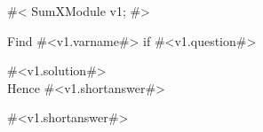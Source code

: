 

#<
SumXModule v1;
#>

Find #<v1.varname#> if #<v1.question#>

#<v1.solution#> \\[1.8mm]
Hence #<v1.shortanswer#>

#<v1.shortanswer#>


